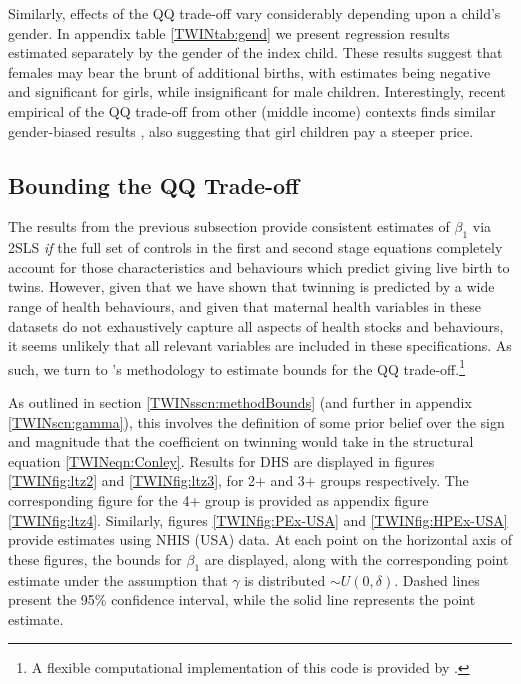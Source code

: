 Similarly, effects of the QQ trade-off vary considerably depending upon a 
child's gender. In appendix table \ref{TWINtab:gend} we present regression 
results estimated separately by the gender of the index child. These results 
suggest that females may bear the brunt of additional births, with estimates
being negative and significant for girls, while insignificant for male children. 
Interestingly, recent empirical of the QQ trade-off from other (middle income)
contexts finds similar gender-biased results \citep{SouzaPonczek2012}, also
suggesting that girl children pay a steeper price.



\subsection{Bounding the QQ Trade-off}           \label{TWINsscn:resultBounds}
The results from the previous subsection provide consistent estimates of 
$\beta_1$ via 2SLS \emph{if} the full set of controls in the first and second 
stage equations completely account for those characteristics and behaviours 
which predict giving live birth to twins. However, given that we have shown that 
twinning is predicted by a wide range of health behaviours, and given that 
maternal health variables in these datasets do not exhaustively capture all 
aspects of health stocks and behaviours, it seems unlikely that all relevant 
variables are included in these specifications. As such, we turn to 
\citeauthor{Conleyetal2012}'s \citeyear{Conleyetal2012} methodology to estimate 
bounds for the QQ trade-off.\footnote{A flexible computational implementation
of this code is provided by \citet{Clarke2014b}.}

As outlined in section \ref{TWINsscn:methodBounds} (and further in appendix
\ref{TWINscn:gamma}), this involves the definition of some prior belief over 
the sign and magnitude that the coefficient on twinning would take in the 
structural equation \ref{TWINeqn:Conley}. Results for DHS are displayed in 
figures \ref{TWINfig:ltz2} and \ref{TWINfig:ltz3}, for 2+ and 3+ groups 
respectively. The corresponding figure for the 4+ group is provided as appendix
figure \ref{TWINfig:ltz4}. Similarly, figures \ref{TWINfig:PEx-USA} and
\ref{TWINfig:HPEx-USA} provide estimates using NHIS (USA) data. At each point 
on the horizontal axis of these figures, the bounds for $\beta_1$ are displayed, 
along with the corresponding point estimate under the assumption that $\gamma$ 
is distributed $\sim U(0,\delta)$. Dashed lines present the 95\% confidence 
interval, while the solid line represents the point estimate.

